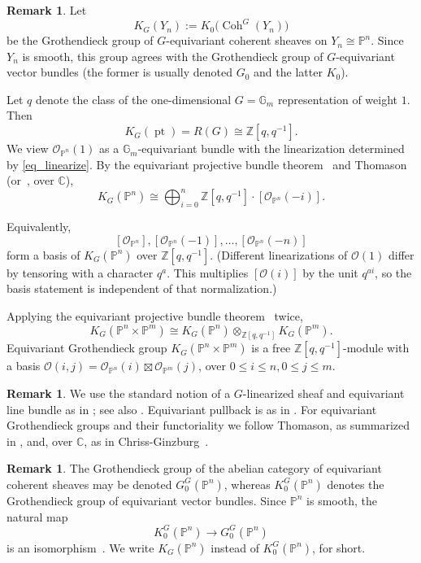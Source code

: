 \documentclass{article}
\def\Z{\mathbb Z}
\newcommand{\mcO}{\mathcal{O}}
\newcommand{\PP}{\mathbb{P}}
\theoremstyle{definition}
\newtheorem{remark}[thm]{Remark}
\theoremstyle{definition}
\begin{document}
\begin{remark}
    Let
\[
K_G(Y_n) := K_0\bigl(\operatorname{Coh}^G(Y_n)\bigr)
\]
be the Grothendieck group of $G$-equivariant coherent sheaves on $Y_n \cong \PP^n$. Since $Y_n$ is smooth, this group agrees with the Grothendieck group of $G$-equivariant vector bundles (the former is usually denoted $G_0$ and the latter $K_0$).


Let $q$ denote the class of the one-dimensional $G = \mathbb{G}_m$ representation of weight $1$. Then
\[
K_G(\operatorname{pt}) = R(G) \cong \mathbb{Z}[q, q^{-1}].
\]
We view $\mcO_{\PP^n}(1)$  as  a $\mathbb{G}_m$-equivariant bundle with the linearization determined by \eqref{eq_linearize}.
By the equivariant projective bundle theorem~\cite[Theorem 10]{Merkurjev} and Thomason~\cite{Thomason} (or~\cite[Section 5.7]{ChrissGinzburg}, over $\mathbb{C}$),
\[
K_G(\PP^n) \cong \bigoplus_{i=0}^{n} \mathbb{Z}[q, q^{-1}] \cdot [\mcO_{\PP^n}(-i)].
\]

Equivalently,
\[
[\mcO_{\PP^n}], [\mcO_{\PP^n}(-1)], \dots, [\mcO_{\PP^n}(-n)]
\]
form a basis of $K_G(\PP^n)$ over $\mathbb{Z}[q, q^{-1}]$. (Different linearizations of $\mcO(1)$ differ by tensoring with a character $q^a$. This multiplies $[\mcO(i)]$ by the unit $q^{ai}$, so the basis statement is independent of that normalization.)
\end{remark}

Applying the equivariant projective bundle theorem~\cite{Thomason} twice,
\[
K_G(\PP^n\times \PP^m) \cong K_G(\PP^n)\otimes_{\Z[q,q^{-1}]}K_G(\PP^m).
\]
 Equivariant Grothendieck group $K_G(\PP^n\times \PP^m)$ is a free $\Z[q,q^{-1}]$-module with a basis $\mcO(i,j)=\mcO_{\PP^n}(i)\boxtimes \mcO_{\PP^m}(j)$, over $0\le i\le n, 0\le j\le m$.

\begin{remark}
We use the standard notion of a $G$-linearized sheaf and equivariant line bundle as in \cite[Ch.~I, \S3, Def.~1.6]{MFK};
see also \cite[Def.~1.33 and Lem.~1.34]{Brion}.
Equivariant pullback is as in \cite[Tag 03LE, Lem.~39.12.2]{stacks-project}.
For equivariant Grothendieck groups and their functoriality we follow Thomason, as summarized in \cite[\S2.2]{Merkurjev}, and, over $\mathbb{C}$, as in Chriss-Ginzburg~\cite{ChrissGinzburg}.
\end{remark}

\begin{remark}
The Grothendieck group of the abelian category of equivariant coherent sheaves may be denoted $G_0^G(\PP^n)$,
whereas $K_0^G(\PP^n)$ denotes the Grothendieck group of equivariant vector bundles. Since $\PP^n$ is smooth, the natural map
\[
K_0^G(\PP^n) \longrightarrow G_0^G(\PP^n)
\]
is an isomorphism~\cite[Theorem 13]{Merkurjev}. We write $K_G(\PP^n)$ instead of $K^G_0(\PP^n)$, for short.
\end{remark}
\end{document}
